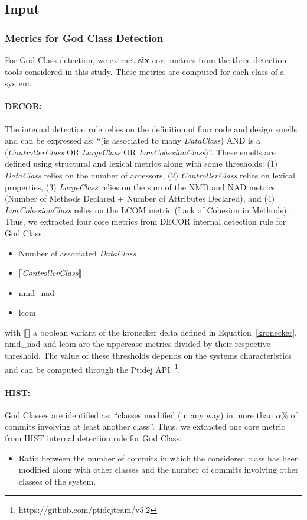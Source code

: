 \subsection{Input}
\label{subsection: input}
\subsubsection{Metrics for God Class Detection}

For God Class detection, we extract \textbf{six} core metrics from the three detection tools considered in this study. These metrics are computed for each class of a system.


\paragraph{DECOR:}
The internal detection rule relies on the definition of four code and design smells and can be expressed as: ``(is associated to many \textit{DataClass}) AND is a (\textit{ControllerClass} OR \textit{LargeClass} OR \textit{LowCohesionClass})''. These smells are defined using structural and lexical metrics along with some thresholds: (1) \textit{DataClass} relies on the number of accessors, (2) \textit{ControllerClass} relies on lexical properties, (3) \textit{LargeClass} relies on the  sum of the NMD and NAD metrics (Number of Methods Declared + Number of Attributes Declared), and (4) \textit{LowCohesionClass} relies on the LCOM metric (Lack of Cohesion in Methods) \cite{briand1998unified}. Thus, we extracted four core metrics from DECOR internal detection rule for God Class:
\begin{itemize}
\item  Number of associated \textit{DataClass}
\item $\llbracket$\textit{ControllerClass}$\rrbracket$
\item nmd\_nad
\item lcom 
\end{itemize}

\noindent with $\llbracket \rrbracket$ a boolean variant of the kronecker delta defined in Equation~\ref{kronecker}, nmd\_nad and lcom are the uppercase metrics divided by their respective threshold. The value of these thresholds depends on the systems characteristics and can be computed through the Ptidej API~\footnote{https://github.com/ptidejteam/v5.2}.

\paragraph{HIST:}
God Classes are identified as: ``classes modified (in any way) in more than $\alpha$\% of commits involving at least another class''. Thus, we extracted one core metric from HIST internal detection rule for God Class:
\begin{itemize}
\item  Ratio between the number of commits in which the considered class has been modified along with other classes and the number of commits involving other classes of the system.
\end{itemize}

